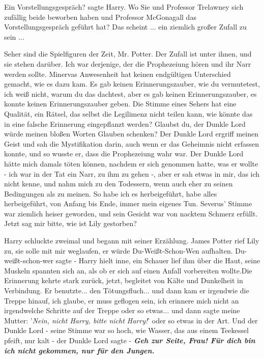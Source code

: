 \glqq Ein Vorstellungsgespräch?\grqq{} sagte Harry. \glqq Wo Sie und Professor
Trelawney sich zufällig beide beworben haben und Professor McGonagall das
Vorstellungsgespräch geführt hat? Das scheint ... ein ziemlich großer Zufall zu
sein ...\grqq{}

\glqq Seher sind die Spielfiguren der Zeit, Mr. Potter. Der Zufall ist unter
ihnen, und sie stehen darüber. Ich war derjenige, der die Prophezeiung hören und
ihr Narr werden sollte. Minervas Anwesenheit hat keinen endgültigen Unterschied
gemacht, wie es dazu kam. Es gab keinen Erinnerungszauber, wie du vermutetest,
ich weiß nicht, warum du das dachtest, aber es gab keinen Erinnerungszauber, es
konnte keinen Erinnerungszauber geben. Die Stimme eines Sehers hat eine
Qualität, ein Rätsel, das selbst die Legilimenz nicht teilen kann, wie könnte
das in eine falsche Erinnerung eingepflanzt werden? Glaubst du, der Dunkle Lord
würde meinen bloßen Worten Glauben schenken? Der Dunkle Lord ergriff meinen
Geist und sah die Mystifikation darin, auch wenn er das Geheimnis nicht erfassen
konnte, und so wusste er, dass die Prophezeiung wahr war. Der Dunkle Lord hätte
mich damals töten können, nachdem er sich genommen hatte, was er wollte - ich
war in der Tat ein Narr, zu ihm zu gehen -, aber er sah etwas in mir, das ich
nicht kenne, und nahm mich zu den Todessern, wenn auch eher zu seinen
Bedingungen als zu meinen. So habe ich es herbeigeführt, habe alles
herbeigeführt, von Anfang bis Ende, immer mein eigenes Tun.\grqq{} Severus'
Stimme war ziemlich heiser geworden, und sein Gesicht war von nacktem Schmerz
erfüllt. \glqq Jetzt sag mir bitte, wie ist Lily gestorben?\grqq{}

Harry schluckte zweimal und begann mit seiner Erzählung. \glqq James Potter rief
Lily zu, sie solle mit mir weglaufen, er würde Du-Weißt-Schon-Wen aufhalten.
Du-weißt-schon-wer sagte -\grqq{} Harry hielt inne, ein Schauer lief ihm über
die Haut, seine Muskeln spannten sich an, als ob er sich auf einen Anfall
vorbereiten wollte.Die Erinnerung kehrte stark zurück, jetzt, begleitet von
Kälte und Dunkelheit in Verbindung. \glqq Er benutzte... den Tötungsfluch... und
dann kam er irgendwie die Treppe hinauf, ich glaube, er muss geflogen sein, ich
erinnere mich nicht an irgendwelche Schritte auf der Treppe oder so etwas... und
dann sagte meine Mutter: '\emph{Nein, nicht Harry, bitte nicht Harry!}' oder so
etwas in der Art. Und der Dunkle Lord - seine Stimme war so hoch, wie Wasser,
das aus einem Teekessel pfeift, nur kalt - der Dunkle Lord sagte\grqq{} -
\textbf{}
\textbf{\emph{Geh zur Seite, Frau! Für dich bin ich nicht gekommen, nur für den
Jungen.}}

